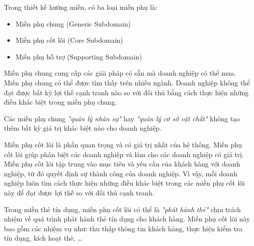 
Trong thiết kế hướng miền, có ba loại miền phụ là:

\begin{itemize}

    \item Miền phụ chung (Generic Subdomain)

    \item Miền phụ cốt lõi (Core Subdomain)

    \item Miền phụ hỗ trợ (Supporting Subdomain)

\end{itemize}


Miền phụ chung cung cấp các giải pháp có sẵn mà doanh nghiệp có thể mua. Miền phụ chung có thể được tìm thấy trên nhiều ngành. Doanh nghiệp không thể đạt được bất kỳ lợi thế cạnh tranh nào so với đối thủ bằng cách thực hiện những điều khác biệt trong miền phụ chung.

\begin{example} Các miền phụ chung \textit{"quản lý nhân sự"} hay \textit{"quản lý cơ sở vật chất"} không tạo thêm bất kỳ giá trị khác biệt nào cho doanh nghiệp.

\end{example}


Miền phụ cốt lõi là phần quan trọng và có giá trị nhất của hệ thống. Miền phụ cốt lõi giúp phân biệt các doanh nghiệp và làm cho các doanh nghiệp có giá trị. Miền phụ cốt lõi tập trung vào mục tiêu và yêu cầu của khách hàng với doanh nghiệp, từ đó quyết định sự thành công của doanh nghiệp. Vì vậy, mỗi doanh nghiệp luôn tìm cách thực hiện những điều khác biệt trong các miền phụ cốt lõi này để đạt được lợi thế so với đối thủ cạnh tranh.

\begin{example} Trong miền thẻ tín dụng, miền phụ cốt lõi có thể là \textit{"phát hành thẻ"} chịu trách nhiệm về quá trình phát hành thẻ tín dụng cho khách hàng. Miền phụ cốt lõi này bao gồm các nhiệm vụ như: thu thập thông tin khách hàng, thực hiện kiểm tra tín dụng, kích hoạt thẻ, \dots

\end{example}

